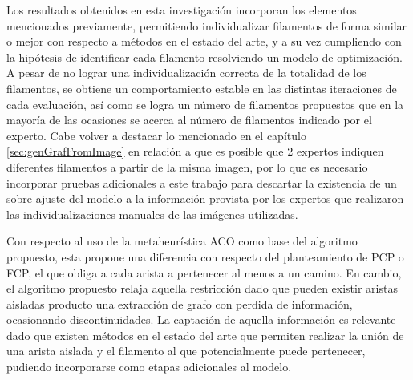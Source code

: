 Los resultados obtenidos en esta investigaci\'on incorporan los elementos mencionados previamente, permitiendo individualizar filamentos de forma similar o mejor con respecto a m\'etodos en el estado del arte, y a su vez cumpliendo con la hip\'otesis de identificar cada filamento resolviendo un modelo de optimizaci\'on. A pesar de no lograr una individualizaci\'on correcta de la totalidad de los filamentos, se obtiene un comportamiento estable en las distintas iteraciones de cada evaluaci\'on, as\'i como se logra un n\'umero de filamentos propuestos que en la mayor\'ia de las ocasiones se acerca al n\'umero de filamentos indicado por el experto. Cabe volver a destacar lo mencionado en el cap\'itulo \ref{sec:genGrafFromImage} en relaci\'on a que es posible que 2 expertos indiquen diferentes filamentos a partir de la misma imagen, por lo que es necesario incorporar pruebas adicionales a este trabajo para descartar la existencia de un sobre-ajuste del modelo a la informaci\'on provista por los expertos que realizaron las individualizaciones manuales de las im\'agenes utilizadas.


Con respecto al uso de la metaheur\'istica ACO como base del algoritmo propuesto, esta propone una diferencia con respecto del planteamiento de PCP o FCP, el que obliga a cada arista a pertenecer al menos a un camino. En cambio, el algoritmo propuesto relaja aquella restricci\'on dado que pueden existir aristas aisladas producto una extracci\'on de grafo con perdida de informaci\'on, ocasionando discontinuidades. La captaci\'on de aquella informaci\'on es relevante dado que existen m\'etodos en el estado del arte que permiten realizar la uni\'on de una arista aislada y el filamento al que potencialmente puede pertenecer, pudiendo incorporarse como etapas adicionales al modelo. 

